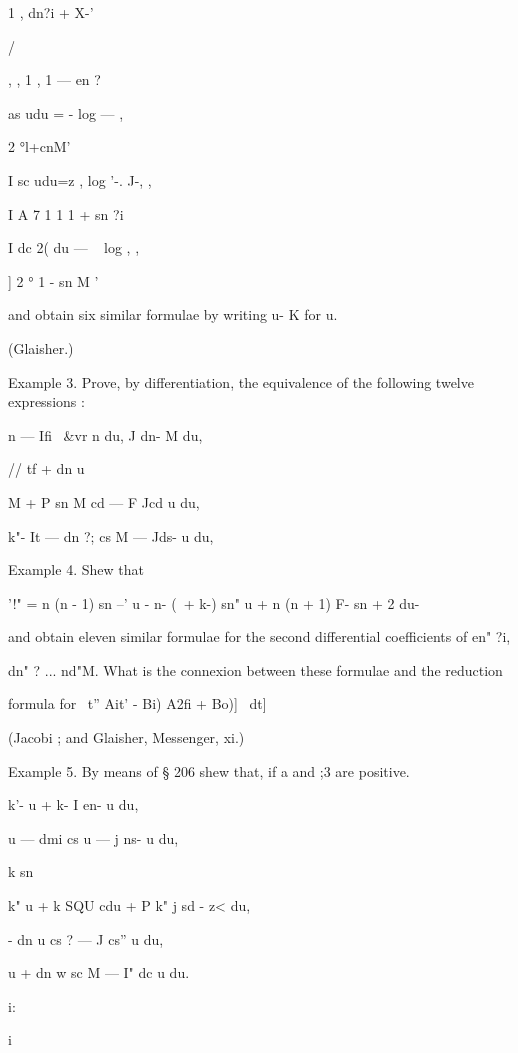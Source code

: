1 , dn?i + X-'



/



, , 1 , 1 — en ?

as udu = - log — ,

2 °l+cnM'



I sc udu=z , log '-. J-, ,

I A 7 1 1 1 + sn ?i

I dc 2( du — ~ log , ,

] 2 ° 1 - sn M '

and obtain six similar formulae by writing u- K for u.

(Glaisher.)

Example 3. Prove, by differentiation, the equivalence of the following
twelve expressions :

n — Ifi \ \&vr n du, J dn- M du,

// tf + dn u%

M + P sn M cd — F Jcd u du,

k"- It — dn ?; cs M — Jds- u du,

Example 4. Shew that

'!" = n (n - 1) sn --' u - n- (\ + k-) sn" u + n (n + 1) F- sn + 2 du-

and obtain eleven similar formulae for the second differential
coefficients of en" ?i,

dn" ? ... nd"M. What is the connexion between these formulae and the
reduction

formula for \ t'' Ait' - Bi) A2fi + Bo)]~ dt]

(Jacobi ; and Glaisher, Messenger, xi.)

Example 5. By means of § 206 shew that, if a and ;3 are positive.



k'- u + k- I en- u du,

u — dmi cs u — j ns- u du,

k sn %

k" u + k SQU cdu + P k" j sd - z< du,

- dn u cs ? — J cs'' u du,

u + dn w sc M — I" dc u du.



i:



 i



